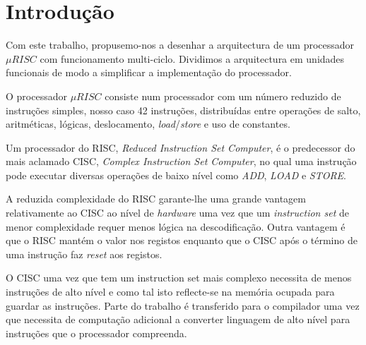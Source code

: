 \chapter{Introdução}
Com este trabalho, propusemo-nos a desenhar a arquitectura de um processador \mbox{$\mu RISC$} com funcionamento multi-ciclo. Dividimos a arquitectura em unidades funcionais de modo a simplificar a implementação do processador.\par
O processador \mbox{$\mu RISC$} consiste num processador com um número reduzido de instruções simples, nosso caso 42 instruções, distribuídas entre operações de salto, aritméticas, lógicas, deslocamento, \textit{load}/\textit{store} e uso de constantes.\par

Um processador do RISC, \textit{Reduced Instruction Set Computer}, é o predecessor do mais aclamado CISC, \textit{Complex Instruction Set Computer}, no qual uma instrução pode executar diversas operações de baixo nível como \textit{ADD}, \textit{LOAD} e \textit{STORE}. 

A reduzida complexidade do RISC garante-lhe uma grande vantagem relativamente ao CISC ao nível de \textit{hardware} uma vez que um \textit{instruction set} de menor complexidade requer menos lógica na descodificação. Outra vantagem é que o RISC mantém o valor nos registos enquanto que o CISC após o término de uma instrução faz \textit{reset} aos registos.

O CISC uma vez que tem um instruction set mais complexo necessita de menos instruções de alto nível e como tal isto reflecte-se na memória ocupada para guardar as instruções. Parte do trabalho é transferido para o compilador uma vez que necessita de computação adicional a converter linguagem de alto nível para instruções que o processador compreenda.